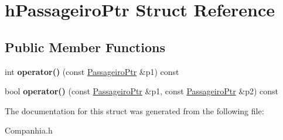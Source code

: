\hypertarget{structh_passageiro_ptr}{}\section{h\+Passageiro\+Ptr Struct Reference}
\label{structh_passageiro_ptr}
\subsection*{Public Member Functions}
\begin{DoxyCompactItemize}
\item 
\mbox{\label{structh_passageiro_ptr_ab6d1646858d4d6420351990100944d87}} 
int {\bfseries operator()} (const \hyperlink{struct_passageiro_ptr}{Passageiro\+Ptr} \&p1) const
\item 
\mbox{\label{structh_passageiro_ptr_a053bb9393f982e11a15196f3d3eb7302}} 
bool {\bfseries operator()} (const \hyperlink{struct_passageiro_ptr}{Passageiro\+Ptr} \&p1, const \hyperlink{struct_passageiro_ptr}{Passageiro\+Ptr} \&p2) const
\end{DoxyCompactItemize}


The documentation for this struct was generated from the following file\+:\begin{DoxyCompactItemize}
\item 
Companhia.\+h\end{DoxyCompactItemize}
